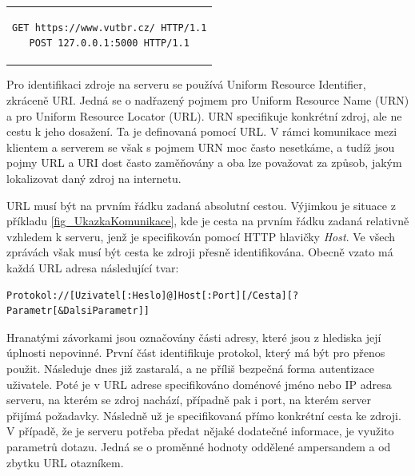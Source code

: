 \begin{center}
\begin{tabular}{c}
\begin{lstlisting}
GET https://www.vutbr.cz/ HTTP/1.1
POST 127.0.0.1:5000 HTTP/1.1
\end{lstlisting}
\end{tabular}
\end{center} 

Pro identifikaci zdroje na serveru se používá Uniform Resource Identifier, zkráceně URI. Jedná se o nadřazený pojmem pro Uniform Resource Name (URN) a pro Uniform Resource Locator (URL). URN specifikuje konkrétní zdroj, ale ne cestu k jeho dosažení. Ta je definovaná pomocí URL. V rámci komunikace mezi klientem a serverem se však s pojmem URN moc často nesetkáme, a tudíž jsou pojmy URL a URI dost často zaměňovány a oba lze považovat za způsob, jakým lokalizovat daný zdroj na internetu.\cite{rfc3986} 


URL musí být na prvním řádku zadaná absolutní cestou. Výjimkou je situace z příkladu \ref{fig_UkazkaKomunikace}, kde je cesta na prvním řádku zadaná relativně vzhledem k serveru, jenž je specifikován pomocí HTTP hlavičky \textit{Host}. Ve všech zprávách však musí být cesta ke zdroji přesně identifikována. 
\newpage
Obecně vzato má každá URL adresa následující tvar: 
\begin{lstlisting}
Protokol://[Uzivatel[:Heslo]@]Host[:Port][/Cesta][?Parametr[&DalsiParametr]]
\end{lstlisting}


Hranatými závorkami jsou označovány části adresy, které jsou z hlediska její úplnosti nepovinné. První část identifikuje protokol, který má být pro přenos použit. Následuje dnes již zastaralá, a ne příliš bezpečná forma autentizace uživatele. Poté je v URL adrese specifikováno doménové jméno nebo IP adresa serveru, na kterém se zdroj nachází, případně pak i port, na kterém server přijímá požadavky. Následně už je specifikovaná přímo konkrétní cesta ke zdroji. V případě, že je serveru potřeba předat nějaké dodatečné informace, je využito parametrů dotazu. Jedná se o proměnné hodnoty oddělené ampersandem a od zbytku URL otazníkem. 


